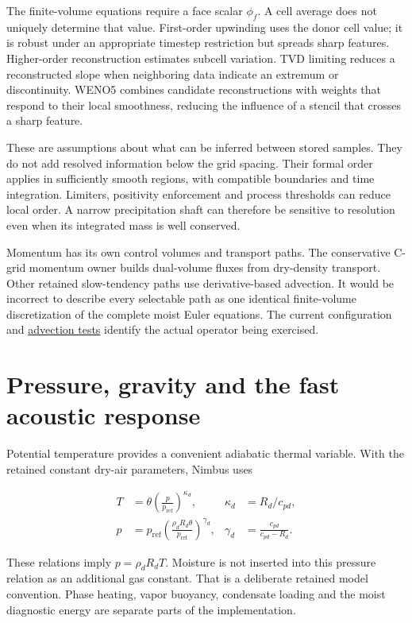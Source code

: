 \documentclass[
  11pt,
]{report}
\begin{document}
The finite-volume equations require a face scalar \(\phi_f\). A cell
average does not uniquely determine that value. First-order upwinding
uses the donor cell value; it is robust under an appropriate timestep
restriction but spreads sharp features. Higher-order reconstruction
estimates subcell variation. TVD limiting reduces a reconstructed slope
when neighboring data indicate an extremum or discontinuity. WENO5
combines candidate reconstructions with weights that respond to their
local smoothness, reducing the influence of a stencil that crosses a
sharp feature.

These are assumptions about what can be inferred between stored samples.
They do not add resolved information below the grid spacing. Their
formal order applies in sufficiently smooth regions, with compatible
boundaries and time integration. Limiters, positivity enforcement and
process thresholds can reduce local order. A narrow precipitation shaft
can therefore be sensitive to resolution even when its integrated mass
is well conserved.

Momentum has its own control volumes and transport paths. The
conservative C-grid momentum owner builds dual-volume fluxes from
dry-density transport. Other retained slow-tendency paths use
derivative-based advection. It would be incorrect to describe every
selectable path as one identical finite-volume discretization of the
complete moist Euler equations. The current configuration and
\href{../tests/numerics/test_advection_cartesian.cpp}{advection tests}
identify the actual operator being exercised.

\section{Pressure, gravity and the fast acoustic
response}\label{pressure-gravity-and-the-fast-acoustic-response}

Potential temperature provides a convenient adiabatic thermal variable.
With the retained constant dry-air parameters, Nimbus uses

\[\begin{aligned}
T &= \theta\left(\frac{p}{p_{\mathrm{ref}}}\right)^{\kappa_d},
&\kappa_d &= R_d/c_{pd}, \\
p &= p_{\mathrm{ref}}
       \left(\frac{\rho_dR_d\theta}{p_{\mathrm{ref}}}\right)^{\gamma_d},
&\gamma_d &= \frac{c_{pd}}{c_{pd}-R_d}.
\end{aligned}\]

These relations imply \(p=\rho_dR_dT\). Moisture is not inserted into
this pressure relation as an additional gas constant. That is a
deliberate retained model convention. Phase heating, vapor buoyancy,
condensate loading and the moist diagnostic energy are separate parts of
the implementation.
\end{document}
